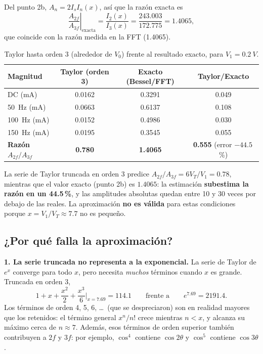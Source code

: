 \documentclass[11pt,letterpaper]{article}
\newcommand{\VT}{V_T}
\begin{document}
Del punto 2b, $A_n=2I_sI_n(x)$, así que la razón exacta es
\begin{equation}
  \left.\frac{A_{2f}}{A_{3f}}\right|_{\text{exacta}}=\frac{I_2(x)}{I_3(x)}=\frac{243.003}{172.775}=1.4065,
\end{equation}
que coincide con la razón medida en la FFT (1.4065).

\begin{table}[h]
\centering
\caption{Taylor hasta orden 3 (alrededor de $V_0$) frente al resultado exacto, para $V_1=\SI{0.2}{V}$.}
\label{tab:3}
\begin{tabular}{@{}lccc@{}}
\toprule
Magnitud & Taylor (orden 3) & Exacto (Bessel/FFT) & Taylor/Exacto \\
\midrule
DC (mA)             & 0.0162 & 0.3291 & 0.049 \\
\SI{50}{Hz} (mA)    & 0.0663 & 0.6137 & 0.108 \\
\SI{100}{Hz} (mA)   & 0.0152 & 0.4986 & 0.030 \\
\SI{150}{Hz} (mA)   & 0.0195 & 0.3545 & 0.055 \\
\midrule
\textbf{Razón $A_{2f}/A_{3f}$} & \textbf{0.780} & \textbf{1.4065} & \textbf{0.555} (error $-44.5$\,\%) \\
\bottomrule
\end{tabular}
\end{table}

\begin{resultado}
La serie de Taylor truncada en orden 3 predice $A_{2f}/A_{3f}=6\VT/V_1=0.78$, mientras que el valor exacto
(punto 2b) es $1.4065$: la estimación \textbf{subestima la razón en un 44.5\,\%}, y las amplitudes absolutas
quedan entre 10 y 30 veces por debajo de las reales. La aproximación \textbf{no es válida} para estas
condiciones porque $x=V_1/\VT\approx7.7$ no es pequeño.
\end{resultado}

\subsection{¿Por qué falla la aproximación?}

\textbf{1. La serie truncada no representa a la exponencial.} La serie de Taylor de $e^x$ converge para
todo $x$, pero necesita \emph{muchos} términos cuando $x$ es grande. Truncada en orden 3,
\begin{equation}
  1+x+\frac{x^2}{2}+\frac{x^3}{6}\bigg|_{x=7.69}=114.1
  \qquad\text{frente a}\qquad e^{7.69}=2191.4 .
\end{equation}
Los términos de orden 4, 5, 6, \ldots\ (que se despreciaron) son en realidad mayores que los retenidos: el
término general $x^n/n!$ crece mientras $n<x$, y alcanza su máximo cerca de $n\approx7$. Además, esos
términos de orden superior también contribuyen a $2f$ y $3f$: por ejemplo, $\cos^4$ contiene $\cos2\theta$ y
$\cos^5$ contiene $\cos3\theta$.
\end{document}
